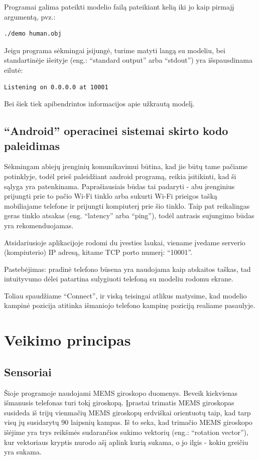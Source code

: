 \documentclass[12pt, a4paper, lithuanian, final]{article}
\begin{document}
Programai galima pateikti modelio failą pateikiant kelią iki jo kaip pirmajį argumentą, pvz.:

\begin{lstlisting}[language=bash]
 ./demo human.obj
\end{lstlisting}

Jeigu programa sėkmingai įsijungė, turime matyti langą su modeliu, bei standartinėje išeityje (eng.: "`standard output"' arba "`stdout"') yra išspausdinama eilutė:
\begin{lstlisting}[language=bash]
Listening on 0.0.0.0 at 10001
\end{lstlisting}
Bei šiek tiek apibendrintos informacijos apie užkrautą modelį.


\subsection{"`Android"' operacinei sistemai skirto kodo paleidimas}

Sėkmingam abiejų įrenginių komunikavimui būtina, kad jie būtų tame pačiame potinklyje, todėl prieš paleidžiant android programą, reikia įsitikinti, kad ši sąlyga yra patenkinama.
Paprašiausiais būdas tai padaryti - abu įrenginius prijungti prie to pačio Wi-Fi tinklo arba sukurti Wi-Fi prieigos tašką mobiliajame telefone ir prijungti kompiuterį prie šio tinklo.
Taip pat reikalingas geras tinklo atsakas (eng. "`latency"' arba "`ping"'), todėl antrasis sujungimo būdas yra rekomenduojamas.

Atsidariusioje aplikacijoje rodomi du įvesties laukai, viename įvedame serverio (kompiuterio) IP adresą, kitame TCP porto numerį: "`10001"'.

Pastebėjimas: pradinė telefono būsena yra naudojama kaip atskaitos taškas, tad intuityvumo dėlei patartina sulygiuoti telefoną su modeliu rodomu ekrane.

Toliau spaudžiame "`Connect"', ir viską teisingai atlikus matysime, kad modelio kampinė pozicija atitinka išmaniojo telefono kampinę poziciją realiame pasaulyje.


\section{Veikimo principas}

\subsection{Sensoriai}
Šioje programoje naudojami MEMS giroskopo duomenys.
Beveik kiekvienas išmanusis telefonas turi tokį giroskopą.
Įprastai trimatis MEMS giroskopas susideda iš trijų vienmačių MEMS giroskopų erdviškai orientuotų taip, kad tarp visų jų susidarytų 90 laipsnių kampas.
Iš to seka, kad trimačio MEMS giroskopo išėjime yra trys reikšmės sudarančios sukimo vektorių (eng.: "`rotation vector"'), kur vektoriaus kryptis nurodo ašį aplink kurią sukama, o jo ilgis - kokiu greičiu yra sukama.
\end{document}
